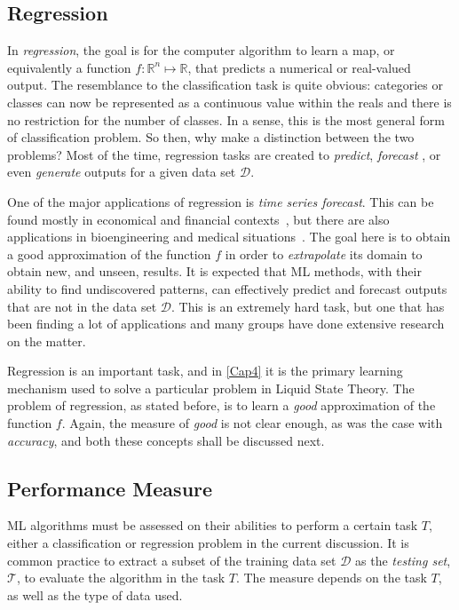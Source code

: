 \subsection{Regression}
In \emph{regression}, the goal is for the computer algorithm to learn a map, or 
equivalently a function $f \colon \mathbb{R}^n \mapsto \mathbb{R}$, that predicts a 
numerical or real-valued output. The resemblance to the classification task is quite 
obvious: categories or classes can now be represented as a continuous value within the 
reals and there is no restriction for the number of classes. In a sense, this is the most 
general form of classification problem. So then, why make a distinction between the two 
problems? Most of the time, regression tasks are created to \emph{predict}, \emph{forecast}
, or even \emph{generate} outputs for a given data set $\mathcal{D}$.

One of the major applications of regression is \emph{time series forecast}. This can 
be found mostly in economical and financial contexts~\cite{bontempiMachineLearningStrategies2013,sezerFinancialTimeSeries2020}, but there are also 
applications in bioengineering and medical situations~\cite{mccoyAssessmentTimeSeriesMachine2018}. The goal here is to obtain a good approximation of 
the function $f$ in order to \emph{extrapolate} its 
domain to obtain new, and unseen, results. It is expected that ML methods, with their 
ability to find undiscovered 
patterns, can effectively predict and forecast outputs that are not in the data set 
$\mathcal{D}$. This is an extremely hard task, but one that has been finding a lot of 
applications and many groups have done extensive research on the matter.

Regression is an important task, and in \autoref{Cap4} it is the primary learning mechanism 
used to solve a particular problem in Liquid State Theory. The problem of regression, as 
stated before, is to learn a \emph{good} approximation of the function $f$. Again, the 
measure of \emph{good} is not clear enough, as was the case with \emph{accuracy}, and both 
these concepts shall be discussed next.

\subsection{Performance Measure} \label{sec:performance}
ML algorithms must be assessed on their abilities to perform a certain task $T$, either a 
classification or regression problem in the current discussion. 
It is common practice to extract a subset of the 
training data set $\mathcal{D}$ as the \emph{testing set}, $\mathcal{T}$, to evaluate the 
algorithm in the task $T$. The measure depends on the task $T$, as well as the type of data 
used.

